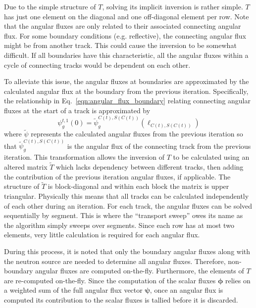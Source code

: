 Due to the simple structure of $T$, solving its implicit inversion is rather simple. $T$ has just one element on the diagonal and one off-diagonal element per row. Note that the angular fluxes are only related to their associated connecting angular flux. For some boundary conditions (e.g. reflective), the connecting angular flux might be from another track. This could cause the inversion to be somewhat difficult. If all boundaries have this characteristic, all the angular fluxes within a cycle of connecting tracks would be dependent on each other.

To alleviate this issue, the angular fluxes at boundaries are approximated by the calculated angular flux at the boundary from the previous iteration. Specifically, the relationship in Eq.~\ref{eqn:angular_flux_boundary} relating connecting angular fluxes at the start of a track is approximated by
\begin{dmath}
	\psi_g^{t,1}(0) = \widetilde{\psi}_g^{C(t),S(C(t))}(\ell_{C(t),S(C(t))})
\end{dmath}
where $\widetilde{\psi}$ represents the calculated angular fluxes from the previous iteration so that $\widetilde{\psi}_g^{C(t),S(C(t))}$ is the angular flux of the connecting track from the previous iteration. This transformation allows the inversion of $T$ to be calculated using an altered matrix $\tilde{T}$ which lacks dependency between different tracks, then adding the contribution of the previous iteration angular fluxes, if applicable. The structure of $\tilde{T}$ is block-diagonal and within each block the matrix is upper triangular. Physically this means that all tracks can be calculated independently of each other during an iteration. For each track, the angular fluxes can be solved sequentially by segment. This is where the ``transport sweep'' owes its name as the algorithm simply sweeps over segments. Since each row has at most two elements, very little calculation is required for each angular flux. 

During this process, it is noted that only the boundary angular fluxes along with the neutron source are needed to determine all angular fluxes. Therefore, non-boundary angular fluxes are computed on-the-fly. Furthermore, the elements of $T$ are re-computed on-the-fly. Since the computation of the scalar fluxes $\boldsymbol{\phi}$ relies on a weighted sum of the full angular flux vector $\boldsymbol{\psi}$, once an angular flux is computed its contribution to the scalar fluxes is tallied before it is discarded.

